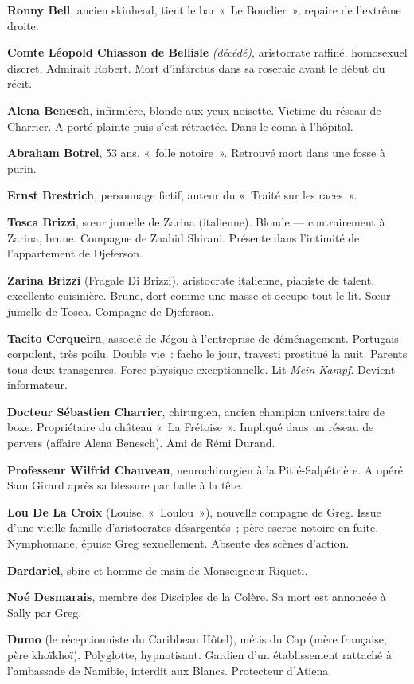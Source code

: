 \textbf{Ronny Bell}, ancien skinhead, tient le bar «~Le Bouclier~», repaire de l'extrême droite.

\textbf{Comte Léopold Chiasson de Bellisle} \emph{(décédé)}, aristocrate raffiné, homosexuel discret. Admirait Robert. Mort d'infarctus dans sa roseraie avant le début du récit.

\textbf{Alena Benesch}, infirmière, blonde aux yeux noisette. Victime du réseau de Charrier. A porté plainte puis s'est rétractée. Dans le coma à l'hôpital.

\textbf{Abraham Botrel}, 53 ans, «~folle notoire~». Retrouvé mort dans une fosse à purin.

\textbf{Ernst Brestrich}, personnage fictif, auteur du «~Traité sur les races~».

\textbf{Tosca Brizzi}, sœur jumelle de Zarina (italienne). Blonde --- contrairement à Zarina, brune. Compagne de Zaahid Shirani. Présente dans l'intimité de l'appartement de Djeferson.

\textbf{Zarina Brizzi} (Fragale Di Brizzi), aristocrate italienne, pianiste de talent, excellente cuisinière. Brune, dort comme une masse et occupe tout le lit. Sœur jumelle de Tosca. Compagne de Djeferson.

\textbf{Tacito Cerqueira}, associé de Jégou à l'entreprise de déménagement. Portugais corpulent, très poilu. Double vie~: facho le jour, travesti prostitué la nuit. Parents tous deux transgenres. Force physique exceptionnelle. Lit \emph{Mein Kampf}. Devient informateur.

\textbf{Docteur Sébastien Charrier}, chirurgien, ancien champion universitaire de boxe. Propriétaire du château «~La Frétoise~». Impliqué dans un réseau de pervers (affaire Alena Benesch). Ami de Rémi Durand.

\textbf{Professeur Wilfrid Chauveau}, neurochirurgien à la Pitié-Salpêtrière. A opéré Sam Girard après sa blessure par balle à la tête.

\textbf{Lou De La Croix} (Louise, «~Loulou~»), nouvelle compagne de Greg. Issue d'une vieille famille d'aristocrates désargentés~; père escroc notoire en fuite. Nymphomane, épuise Greg sexuellement. Absente des scènes d'action.

\textbf{Dardariel}, sbire et homme de main de Monseigneur Riqueti.

\textbf{Noé Desmarais}, membre des Disciples de la Colère. Sa mort est annoncée à Sally par Greg.

\textbf{Dumo} (le réceptionniste du Caribbean Hôtel), métis du Cap (mère française, père khoïkhoï). Polyglotte, hypnotisant. Gardien d'un établissement rattaché à l'ambassade de Namibie, interdit aux Blancs. Protecteur d'Atiena.

